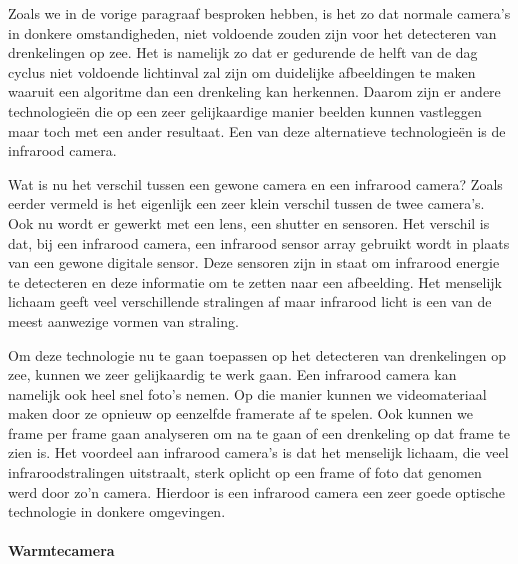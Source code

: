 Zoals we in de vorige paragraaf besproken hebben, is het zo dat normale camera's in donkere omstandigheden, niet voldoende zouden zijn voor het detecteren van drenkelingen op zee. Het is namelijk zo dat er gedurende de helft van de dag cyclus niet voldoende lichtinval zal zijn om duidelijke afbeeldingen te maken waaruit een algoritme dan een drenkeling kan herkennen. Daarom zijn er andere technologieën die op een zeer gelijkaardige manier beelden kunnen vastleggen maar toch met een ander resultaat. Een van deze alternatieve technologieën is de infrarood camera. 


Wat is nu het verschil tussen een gewone camera en een infrarood camera? Zoals eerder vermeld is het eigenlijk een zeer klein verschil tussen de twee camera's. Ook nu wordt er gewerkt met een lens, een shutter en sensoren. Het verschil is dat, bij een infrarood camera, een infrarood sensor array gebruikt wordt in plaats van een gewone digitale sensor. Deze sensoren zijn in staat om infrarood energie te detecteren en deze informatie om te zetten naar een afbeelding. Het menselijk lichaam geeft veel verschillende stralingen af maar infrarood licht is een van de meest aanwezige vormen van straling.


Om deze technologie nu te gaan toepassen op het detecteren van drenkelingen op zee, kunnen we zeer gelijkaardig te werk gaan. Een infrarood camera kan namelijk ook heel snel foto's nemen. Op die manier kunnen we videomateriaal maken door ze opnieuw op eenzelfde framerate af te spelen. Ook kunnen we frame per frame gaan analyseren om na te gaan of een drenkeling op dat frame te zien is. Het voordeel aan infrarood camera's is dat het menselijk lichaam, die veel infraroodstralingen uitstraalt, sterk oplicht op een frame of foto dat genomen werd door zo'n camera. Hierdoor is een infrarood camera een zeer goede optische technologie in donkere omgevingen. 
\paragraph{Warmtecamera}

